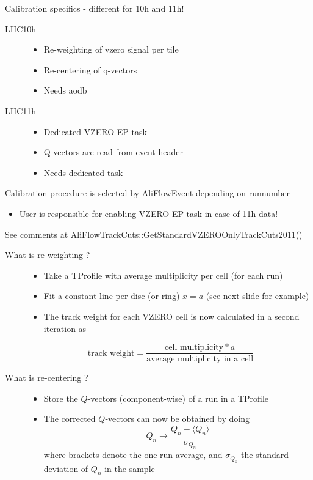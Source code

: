 \documentclass[a4paper]{book}
\numberwithin{equation}{subsection}
\begin{document}
Calibration specifics - different for 10h and 11h!
\begin{description}
\item [LHC10h]
\begin{itemize}
\item Re-weighting of vzero signal per tile
\item Re-centering of q-vectors
\item Needs aodb 
\end{itemize}
\item [LHC11h]
\begin{itemize}
\item Dedicated VZERO-EP task
\item Q-vectors are read from event header
\item Needs dedicated task
\end{itemize}
\end{description}
Calibration procedure is selected by AliFlowEvent depending on runnumber
\begin{itemize}
\item User is responsible for enabling VZERO-EP task in case of 11h data!
\end{itemize}
See comments at AliFlowTrackCuts::GetStandardVZEROOnlyTrackCuts2011()
\begin{description}
\item [What is re-weighting ?]
\begin{itemize}
\item Take a TProfile with average multiplicity per cell (for each run)
\item Fit a constant line per disc (or ring) $x = a$ (see next slide for example)
\item The track weight for each VZERO cell is now calculated in a second iteration as
\end{itemize}
\begin{equation}
\mbox{track weight} = \frac{\mbox{cell multiplicity} * a}{\mbox{average multiplicity in a cell}} \nonumber
\end{equation}
\item [What is re-centering ?]
\begin{itemize}
\item Store the $Q$-vectors (component-wise) of a run in a TProfile
\item The corrected $Q$-vectors can now be obtained by doing
\begin{equation}
Q_n \longrightarrow \frac{Q_n - \langle Q_n \rangle }{\sigma_{Q_n}} \nonumber
\end{equation}
where brackets denote the one-run average, and $\sigma_{Q_n}$ the standard deviation of $Q_n$ in the sample
\end{itemize}
\end{description}
\end{document}
